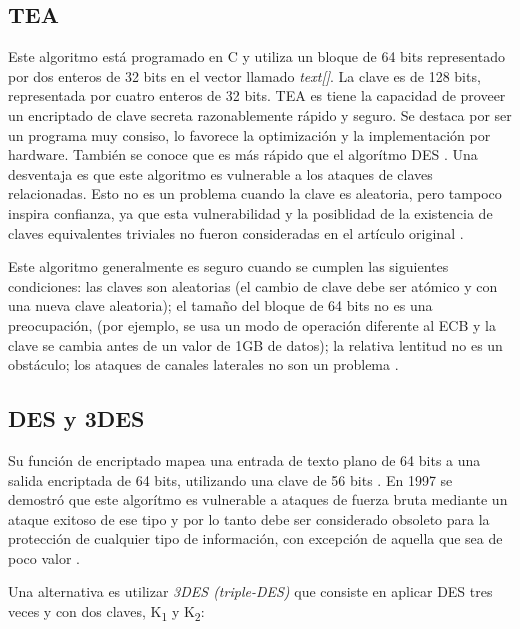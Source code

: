 \subsection{TEA}\label{secc:tea}

Este algoritmo está programado en C y utiliza un bloque de 64 bits representado 
por dos enteros de 32 bits en el vector llamado \emph{text[]}. 
La clave es de 128 bits, representada por cuatro enteros de 32 bits. 
TEA es tiene la capacidad de proveer un encriptado de clave secreta 
razonablemente rápido y seguro. Se destaca por ser un programa muy consiso, lo 
favorece la optimización y la implementación por hardware.
También se conoce que es más rápido que el algorítmo DES \cite{coulouris}.
Una desventaja es que este algoritmo es vulnerable a los ataques de claves 
relacionadas. Esto no es un problema cuando la clave es aleatoria, pero tampoco 
inspira confianza, ya que esta vulnerabilidad y la posiblidad de la existencia de 
claves equivalentes triviales no fueron consideradas en el artículo original 
\cite{stackexchange-crypto-tea}.

Este algoritmo generalmente es seguro cuando se cumplen las siguientes 
condiciones: 
las claves son aleatorias (el cambio de clave debe ser atómico y con una nueva 
clave aleatoria); el tamaño del bloque de 64 bits no es una preocupación,
(por ejemplo, se usa un modo de operación diferente al ECB y la clave se cambia 
antes de un valor de 1GB de datos); la relativa lentitud no es un obstáculo; 
los ataques de canales laterales no son un problema \cite{stackexchange-crypto-tea}.


\subsection{DES y 3DES}\label{secc:DES}

Su función de encriptado mapea una entrada de texto plano de 64 bits a una 
salida encriptada de 64 bits, utilizando una clave de 56 bits \cite{coulouris}.
En 1997 se demostró que este algorítmo es vulnerable a ataques de fuerza bruta 
mediante un ataque exitoso de ese tipo y por lo tanto debe ser considerado 
obsoleto para la protección de cualquier tipo de información, con excepción de 
aquella que sea de poco valor \cite{coulouris}.

Una alternativa es utilizar \emph{3DES (triple-DES)} que consiste en aplicar DES 
tres veces y con dos claves, K\textsubscript{1} y K\textsubscript{2}:

